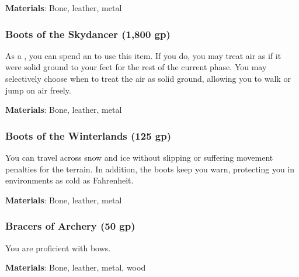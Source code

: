 \vspace{0.25em}
\textbf{Materials}: Bone, leather, metal


\lowercase{\hypertarget{item:Boots of the Skydancer}{}}\label{item:Boots of the Skydancer}
\hypertarget{item:Boots of the Skydancer}{\subsubsection{Boots of the Skydancer\hfill{} (1,800 gp)}}

As a , you can spend an  to use this item.
If you do, you may treat air as if it were solid ground to your feet for the rest of the current phase.
You may selectively choose when to treat the air as solid ground, allowing you to walk or jump on air freely.



\vspace{0.25em}
\textbf{Materials}: Bone, leather, metal


\lowercase{\hypertarget{item:Boots of the Winterlands}{}}\label{item:Boots of the Winterlands}
\hypertarget{item:Boots of the Winterlands}{\subsubsection{Boots of the Winterlands\hfill{} (125 gp)}}

You can travel across snow and ice without slipping or suffering movement penalties for the terrain.
In addition, the boots keep you warn, protecting you in environments as cold as  Fahrenheit.



\vspace{0.25em}
\textbf{Materials}: Bone, leather, metal


\lowercase{\hypertarget{item:Bracers of Archery}{}}\label{item:Bracers of Archery}
\hypertarget{item:Bracers of Archery}{\subsubsection{Bracers of Archery\hfill{} (50 gp)}}

You are proficient with bows.



\vspace{0.25em}
\textbf{Materials}: Bone, leather, metal, wood


